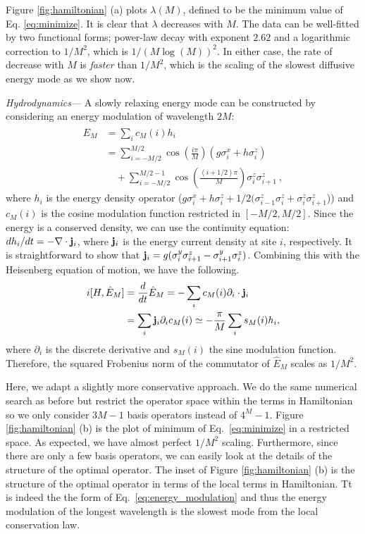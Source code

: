 \documentclass[twocolumn,superscriptaddress, prb]{revtex4-1}
\begin{document}
Figure \ref{fig:hamiltonian} (a) plots $\lambda (M)$, defined to be the minimum value of Eq. \eqref{eq:minimize}.
It is clear that $\lambda$ decreases with $M$.
The data can be well-fitted by two functional forms; power-law decay with exponent $2.62$ and a logarithmic correction to $1/M^2$, which is $1/(M\log(M))^2$.
In either case, the rate of decrease with $M$ is {\it faster} than $1/M^2$, which is the scaling of the slowest diffusive energy mode as we show now.

{\it Hydrodynamics---}
A slowly relaxing energy mode can be constructed by considering an energy modulation of wavelength $2M$:
\begin{align}
\hat{E}_M &= \sum_i c_M(i) h_i \nonumber\\
&= \sum_{i=-M/2}^{M/2} \cos\left(\frac{i\pi}{M}\right)(g \sigma^x_i + h\sigma^z_i)\nonumber\\
&\quad+ \sum_{i=-M/2}^{M/2-1} \cos\left(\frac{(i+1/2)\pi}{M}\right)\sigma^z_i\sigma^z_{i+1} ~,
\label{eq:energy_modulation}
\end{align}
where $h_i$ is the energy density operator ($g \sigma^x_i + h\sigma^z_i + 1/2(\sigma^z_{i-1}\sigma^z_i + \sigma^z_i\sigma^z_{i+1}$))
and $c_M(i)$ is the cosine modulation function restricted in $[-M/2,M/2]$.
Since the energy is a conserved density, we can use the continuity equation:
$d h_i/dt = -\nabla \cdot {\bf j}_i$, where ${\bf j}_i$ is the energy current density at site $i$, respectively.
It is straightforward to show that ${\bf j}_i = g(\sigma^y_i \sigma^z_{i+1} - \sigma^y_{i+1} \sigma^z_i)$.
Combining this with the Heisenberg equation of motion, we have the following.
\begin{align}
 i[H,\hat{E}_M] &= \frac{d}{dt} \hat{E}_M = -\sum_i c_M(i) \partial_i \cdot {\bf j}_i \\
 &= \sum_i {\bf j}_i \partial_i c_M(i) \simeq -\frac{\pi}{M} \sum_i s_M(i) h_i,
\end{align}
where $\partial_i$ is the discrete derivative and $s_M(i)$ the sine modulation function.
Therefore, the squared Frobenius norm of the commutator of $\hat{E}_M$ scales as $1/M^2$.

Here, we adapt a slightly more conservative approach.
We do the same numerical search as before but restrict the operator space within the terms in Hamiltonian
so we only consider $3M-1$ basis operators instead of $4^M-1$.
Figure \ref{fig:hamiltonian} (b) is the plot of minimum of Eq.~\eqref{eq:minimize} in a restricted space.
As expected, we have almost perfect $1/M^2$ scaling.
Furthermore, since there are only a few basis operators, we can easily look at the details of the structure of the optimal operator.
The inset of Figure \ref{fig:hamiltonian} (b) is the structure of the optimal operator in terms of the local terms in Hamiltonian.
Tt is indeed the the form of Eq.~\eqref{eq:energy_modulation} and thus the energy modulation of the longest wavelength is the slowest mode
from the local conservation law.
\end{document}
